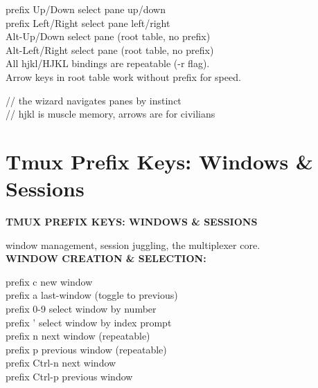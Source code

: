 \documentclass[11pt,a4paper,twoside]{book}
\begin{document}
prefix Up/Down        select pane up/down\\
prefix Left/Right     select pane left/right\\
Alt-Up/Down           select pane (root table, no prefix)\\
Alt-Left/Right        select pane (root table, no prefix)\\

All hjkl/HJKL bindings are repeatable (-r flag).\\
Arrow keys in root table work without prefix for speed.\\

\begin{codebox}
\color{neongreen}// the wizard navigates panes by instinct\\
\color{neongreen}// hjkl is muscle memory, arrows are for civilians\\
\end{codebox}


\vspace{16pt}

\section{Tmux Prefix Keys: Windows \& Sessions}


\vspace{10pt}
{\large\bfseries\color{neoncyan} TMUX PREFIX KEYS: WINDOWS \& SESSIONS}\vspace{6pt}

window management, session juggling, the multiplexer core.\\


\vspace{12pt}
{\bfseries\color{neonyellow} WINDOW CREATION \& SELECTION:}\vspace{4pt}

prefix c              new window\\
prefix a              last-window (toggle to previous)\\
prefix 0-9            select window by number\\
prefix '              select window by index prompt\\
prefix n              next window (repeatable)\\
prefix p              previous window (repeatable)\\
prefix Ctrl-n         next window\\
prefix Ctrl-p         previous window\\
\end{document}
